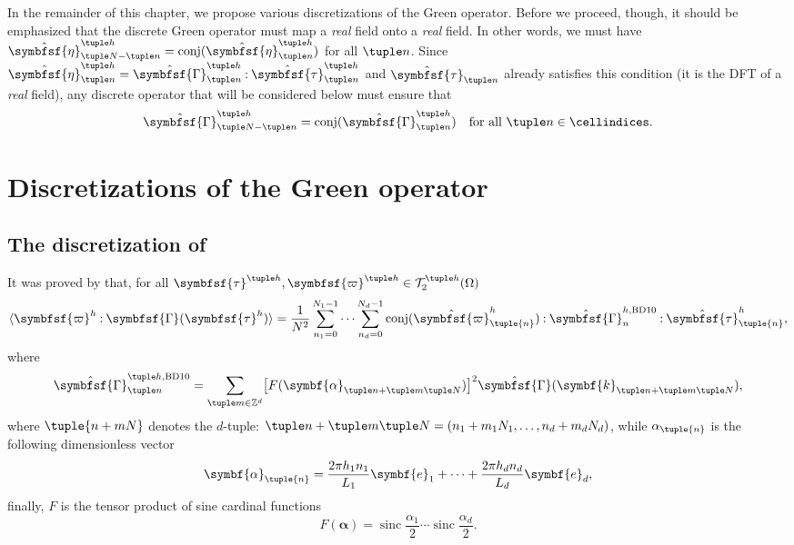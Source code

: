 \documentclass[draft, appendixprefix=true, chapterprefix=true, fontsize=12pt, numbers=noendperiod]{scrbook}
\DeclareMathOperator{\conj}{conj}
\newcommand{\dbldot}{\mathbin{\mathord{:}}}
\newcommand{\integers}{\mathbb{Z}}
\newcommand{\tens}[1]{\symbfsf{#1}}
\renewcommand{\vec}[1]{\symbf{#1}}
\DeclareMathOperator{\sinc}{sinc}
\newcommand{\tensors}{\mathcal T}
\begin{document}
\bigskip

In the remainder of this chapter, we propose various discretizations of the
Green operator. Before we proceed, though, it should be emphasized that the
discrete Green operator must map a \emph{real} field onto a \emph{real}
field. In other words, we must have
\(\hat{\tens\eta}_{\tuple N-\tuple n}^{\tuple h}=\conj(\hat{\tens\eta}_{\tuple
  n}^{\tuple h})\) for all \(\tuple n\). Since
\(\hat{\tens\eta}_{\tuple n}^{\tuple h} =\hat{\tens\Gamma}_{\tuple n}^{\tuple
  h}\dbldot \hat{\tens\tau}_{\tuple n}^{\tuple h}\) and
\(\hat{\tens\tau}_{\tuple n}\) already satisfies this condition (it is the DFT
of a \emph{real} field), any discrete operator that will be considered below
must ensure that
\begin{equation}
  \label{eq:20203503053509}
  \hat{\tens\Gamma}_{\tuple N-\tuple n}^{\tuple h}=\conj(\hat{\tens\Gamma}_{\tuple
    n}^{\tuple h})\quad\text{for all }\tuple n\in\cellindices.
\end{equation}

\section{Discretizations of the Green operator}

\subsection{The discretization of \textcite{bris2010a}}

It was proved by \textcite{bris2010a} that, for all
\(\tens\tau^{\tuple h}, \tens\varpi^{\tuple h}\in\tensors_2^{\tuple
  h}(\Omega)\)
\begin{equation}
  \label{eq:20202118112132}
  \langle\tens\varpi^h\dbldot\tens\Gamma(\tens\tau^h)\rangle=\frac1{N^2}
  \sum_{n_1=0}^{N_1-1}\cdots\sum_{n_d=0}^{N_d-1}\conj(\hat{\tens\varpi}_
  {\tuple{n}}^h)\dbldot\hat{\tens\Gamma}_n^{h, \mathrm{BD10}}\dbldot
  \hat{\tens\tau}_{\tuple{n}}^h,
\end{equation}
where
\begin{equation}
  \label{eq:20202218112204}
  \hat{\tens\Gamma}_{\tuple n}^{\tuple h, \mathrm{BD10}}
  =\sum_{\tuple m\in\integers^d}\bigl[F(\vec\alpha_{\tuple n+\tuple m\tuple N})
  \bigr]^2\hat{\tens\Gamma}(\vec k_{\tuple n+\tuple m\tuple N}),
\end{equation}
where \(\tuple{n+mN}\) denotes the \(d\)-tuple:
\(\tuple n+\tuple m\tuple N=(n_1+m_1N_1, \ldots, n_d+m_dN_d)\), while
\(\alpha_{\tuple{n}}\) is the following dimensionless vector
\begin{equation}
  \vec\alpha_{\tuple{n}}=\frac{2\pi h_1n_1}{L_1}\vec e_1+\cdots+\frac{2\pi h_dn_d}{L_d}\vec e_d,
\end{equation}
finally, \(F\) is the tensor product of sine cardinal functions
\begin{equation}
  F(\vec\alpha)=\sinc\frac{\alpha_1}2\cdots\sinc\frac{\alpha_d}2.
\end{equation}
\end{document}
